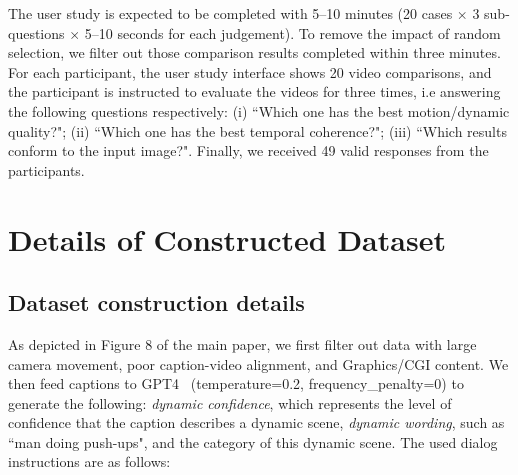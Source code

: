 The user study is expected to be completed with 5--10 minutes (20 cases $\times$ 3 sub-questions $\times$ 5--10 seconds for each judgement). To remove the impact of random selection, we filter out those comparison results completed within three minutes. For each participant, the user study interface shows 20 video comparisons, and the participant is instructed to evaluate the videos for three times, i.e answering the following questions respectively: (i) ``Which one has the best motion/dynamic quality?"; (ii) ``Which one has the best temporal coherence?"; (iii) ``Which results conform to the input image?". Finally, we received 49 valid responses from the participants.


\section{Details of Constructed Dataset}
\label{sec:dataset}

\subsection{Dataset construction details}
As depicted in Figure 8 of the main paper, we first filter out data with large camera movement, poor caption-video alignment, and Graphics/CGI content. We then feed captions to GPT4~\cite{openai2023gpt4} (temperature=0.2, frequency\_penalty=0) to generate the following: \emph{dynamic confidence}, which represents the level of confidence that the caption describes a dynamic scene, \emph{dynamic wording}, such as ``man doing push-ups", and the category of this dynamic scene. The used dialog instructions are as follows:
\noindent\makebox[\linewidth]{\rule{\linewidth}{0.4pt}}
\vspace{-8mm}
